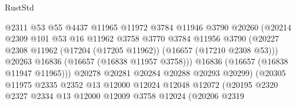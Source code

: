 \begin{lexlean}{RustStd}
\begin{coremodule}
                                      @2311
                                      @53
                                      @55
                                      @4437
                                      @11965
                                      @11972
                                      @3784
                                      @11946
                                      @3790
                                      @20260
                                      (@20214
                                        @2309
                                        @101
                                        @53
                                        @16
                                        @11962
                                        @3758
                                        @3770
                                        @3784
                                        @11956
                                        @3790
                                        (@20227
                                          @2308
                                          @11962
                                          (@17204 (@17205 @11962))
                                          (@16657 (@17210 @2308 @53)))
                                        @20263
                                        @16836
                                        (@16657 (@16838 @11957 @3758)))
                                      @16836
                                      (@16657 (@16838 @11947 @11965)))
                                    @20278
                                    @20281
                                    @20284
                                    @20288
                                    @20293
                                    @20299)
                                  (@20305
                                    @11975
                                    @2335
                                    @2352
                                    @13
                                    @12000
                                    @12024
                                    @12048
                                    @12072
                                    (@20195
                                      @2320
                                      @2327
                                      @2334
                                      @13
                                      @12000
                                      @12009
                                      @3758
                                      @12024
                                      (@20206
                                        @2319

\end{coremodule}
\end{lexlean}
